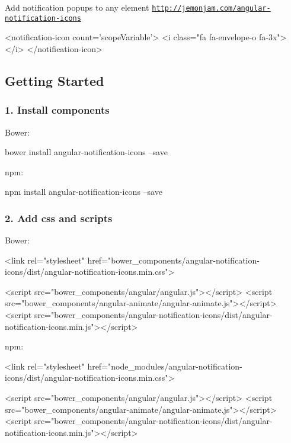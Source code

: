 Add notification popups to any element \href{http://jemonjam.com/angular-notification-icons}{\tt http\+://jemonjam.\+com/angular-\/notification-\/icons}

\href{https://travis-ci.org/jacob-meacham/angular-notification-icons}{\tt } \href{https://coveralls.io/r/jacob-meacham/angular-notification-icons?branch=develop}{\tt } \href{https://codeclimate.com/github/jacob-meacham/grunt-lcov-merge}{\tt }




\begin{DoxyCode}
<notification-icon count='scopeVariable'>
  <i class="fa fa-envelope-o fa-3x"></i>
</notification-icon>
\end{DoxyCode}


\subsection*{Getting Started}

\subsubsection*{1. Install components}

Bower\+: 
\begin{DoxyCode}
bower install angular-notification-icons --save
\end{DoxyCode}


npm\+: 
\begin{DoxyCode}
npm install angular-notification-icons --save
\end{DoxyCode}


\subsubsection*{2. Add css and scripts}

Bower\+: 
\begin{DoxyCode}
<link rel="stylesheet"
       href="bower\_components/angular-notification-icons/dist/angular-notification-icons.min.css">

<script src="bower\_components/angular/angular.js"></script>
<script src="bower\_components/angular-animate/angular-animate.js"></script> 
<script src="bower\_components/angular-notification-icons/dist/angular-notification-icons.min.js"></script>
\end{DoxyCode}


npm\+: 
\begin{DoxyCode}
<link rel="stylesheet"
       href="node\_modules/angular-notification-icons/dist/angular-notification-icons.min.css">

<script src="bower\_components/angular/angular.js"></script>
<script src="bower\_components/angular-animate/angular-animate.js"></script> 
<script src="bower\_components/angular-notification-icons/dist/angular-notification-icons.min.js"></script>
\end{DoxyCode}


